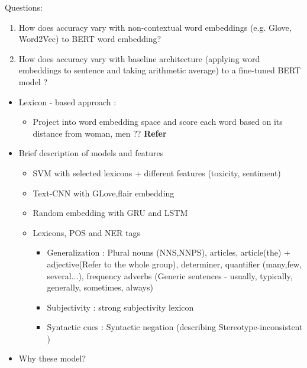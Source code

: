 Questions:

\begin{enumerate}
    \item How does accuracy vary with non-contextual word embeddings (e.g. Glove, Word2Vec) to BERT word embedding?
    \item How does accuracy vary with baseline architecture (applying word embeddings to sentence and taking arithmetic average) to a fine-tuned BERT model ?
\end{enumerate}

    \begin{itemize}
        \item Lexicon - based approach : 
        \begin{itemize}
            \item Project into word embedding space and score each word based on its distance from woman, men ??
            \textbf{Refer }\cite{cryan2020detecting}
        \end{itemize}
        \item Brief description of  models and features
        \begin{itemize}
            \item SVM with selected lexicons + different features (toxicity, sentiment)
            \item Text-CNN with GLove,flair embedding
            \item Random embedding with GRU and LSTM 
        \end{itemize}
        \begin{itemize}
            \item Lexicons, POS and NER tags 
            \begin{itemize}
                \item Generalization : Plural nouns (NNS,NNPS), articles, article(the) + adjective(Refer to the whole group), determiner, quantifier (many,few, several...), frequency adverbs (Generic sentences - usually, typically, generally, sometimes, always)
                \item Subjectivity : strong subjectivity lexicon \cite{tangpersonalized}
                \item Syntactic cues : Syntactic negation (describing Stereotype-inconsistent )
            \end{itemize}
        \end{itemize}
        \item Why these model?
    \end{itemize}
    
